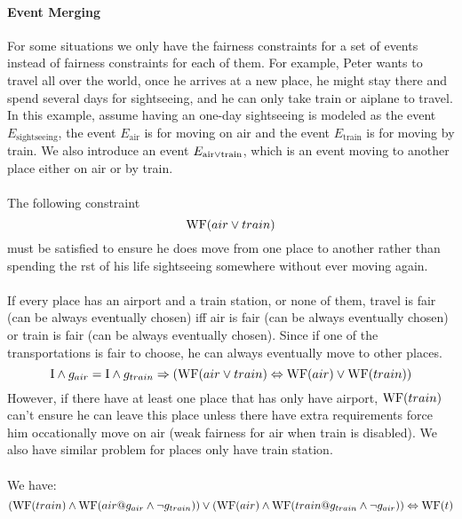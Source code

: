 \paragraph{Event Merging}
For some situations we only have the fairness constraints for a set of events instead of fairness constraints for each of them. For example, Peter wants to travel all over the world, once he arrives at a new place, he might stay there and spend several days for sightseeing, and he can only take train or aiplane to travel. In this example, assume having an one-day sightseeing is modeled as the event $E_{\mathrm{sightseeing}}$, the event $E_{\mathrm{air}}$ is for moving on air and the event $E_{\mathrm{train}}$ is for moving by train. We also introduce an event $E_{\mathrm{air}\vee\mathrm{train}}$, which is an event moving to another place either on air or by train.\\

\\
The following constraint
\begin{displaymath}
  \mathrm{WF}(air\vee{train})
\end{displaymath}
must be satisfied to ensure he does move from one place to another rather than spending the rst of his life sightseeing somewhere without ever moving again.\\

\\
If every place has an airport and a train station, or none of them, travel is fair (can be always eventually chosen) iff air is fair (can be always eventually chosen) or train is fair (can be always eventually chosen). Since if one of the transportations is fair to choose, he can always eventually move to other places.
\begin{displaymath}
  \mathrm{I}\wedge{g_{air}} = \mathrm{I}\wedge{g_{train}}\Rightarrow(\mathrm{WF}(air\vee{train})\Leftrightarrow\mathrm{WF}(air)\lor\mathrm{WF}(train))
\end{displaymath}
However, if there have at least one place that has only have airport, $\mathrm{WF}(train)$ can't ensure he can leave this place unless there have extra requirements force him occationally move on air (weak fairness for air when train is disabled). We also have similar problem for places only have train station. \\

\\
We have:
\begin{displaymath}
  (\mathrm{WF}(train)\wedge\mathrm{WF}(air@g_{air}\wedge\neg{g}_{train}))\vee(\mathrm{WF}(air)\wedge\mathrm{WF}(train@g_{train}\wedge\neg{g}_{air})) \Leftrightarrow\mathrm{WF}(t)
\end{displaymath}
